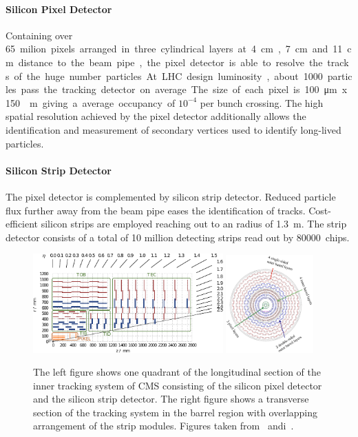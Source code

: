 \paragraph{Silicon Pixel Detector} Containing over \SI{65} milion pixels
arranged in three cylindrical layers at \SI{4}{\centi\meter},
\SI{7}{\centi\meter} and \SI{11}{\centi\meter} distance to the beam pipe, the
pixel detector is able to resolve the tracks of the huge number particles. At
LHC design luminosity, about 1000 particles pass the tracking detector on
average. The size of each pixel is \SI{100}{\micro \meter} x \SI{150}{\micro
\meter} giving a average occupancy of $10^{-4}$ per bunch crossing.  The high
spatial resolution achieved by the pixel detector additionally allows the
identification and measurement of secondary vertices used to identify long-lived
particles.

\paragraph{Silicon Strip Detector} The pixel detector is complemented by silicon
strip detector. Reduced particle flux further away from the beam pipe eases the identification
of tracks. Cost-efficient silicon strips are employed reaching out to
an radius of \SI{1.3}{\meter}. The strip detector consists of a total of 10 million
detecting strips read out by \SI{80000} chips. 

\begin{figure}[htp]
    \centering
    \includegraphics[width=0.65\textwidth]{figures/cms_detector/tracker.pdf}\hfill
    \includegraphics[width=0.3\textwidth]{figures/cms_detector/tracking_sytem_barrel_slice.png}
    \caption[Inner Tracking System]{The left figure shows one quadrant of the
        longitudinal section of the inner tracking system of CMS consisting of the
        silicon pixel detector and the silicon strip detector. The right figure shows a
        transverse section of the tracking system in the barrel region with overlapping
        arrangement of the strip modules. Figures taken
        from~\cite{Berger:2014aca} andi~\cite{cmsweb:innertracker}.}
    \label{fig:cms:inner_tracking}
\end{figure}

